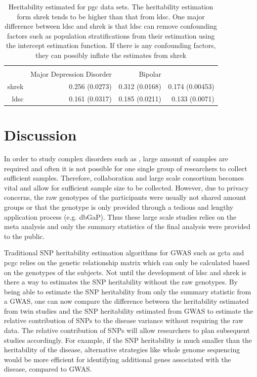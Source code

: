 		\begin{table}
			\centering
			\begin{tabular}{rrrr}
				\toprule
				 \\
				& Major Depression Disorder & Bipolar & \Glng{scz}\\
				\midrule
				\gls{shrek}   & 0.256 (0.0273)  & 0.312 (0.0168)  & 0.174 (0.00453) \\
				\gls{ldsc}   & 0.161 (0.0317) & 0.185 (0.0211) & 0.133 (0.0071)\\
				\bottomrule
			\end{tabular}
			\caption[Heritability Estimated for PGC Data Sets]{
				Heritability estimated for \gls{pgc} data sets.
				The heritability estimation form \gls{shrek} tends to be higher than that from \gls{ldsc}.
				One major difference between \gls{ldsc} and \gls{shrek} is that \gls{ldsc} can remove confounding factors such as population stratifications from their estimation using the intercept estimation function. 
				If there is any confounding factors, they can possibly inflate the estimates from \gls{shrek}
			}
			\label{tab:realData}
		\end{table}
		
	\section{Discussion}
	In order to study complex disorders such as , large amount of samples are required and often it is not possible for one single group of researchers to collect sufficient samples.
	Therefore, collaboration and large scale consortium becomes vital and allow for sufficient sample size to be collected.
	However, due to privacy concerns, the raw genotypes of the participants were usually not shared amount groups or that the genotype is only provided through a tedious and lengthy application process (e.g. dbGaP).
	Thus these large scale studies relies on the meta analysis and only the summary statistics of the final analysis were provided to the public.
	
	Traditional \gls{SNP} heritability estimation algorithms for \gls{GWAS} such as \gls{gcta} and \gls{pcgc} relies on the genetic relationship matrix which can only be calculated based on the genotypes of the subjects.
	Not until the development of \gls{ldsc} and \gls{shrek} is there a way to estimates the \gls{SNP} heritability without the raw genotypes.
	By being able to estimate the \gls{SNP} heritability from only the summary statistic from a \gls{GWAS}, one can now compare the difference between the heritability estimated from twin studies and the \gls{SNP} heritability estimated from \gls{GWAS} to estimate the relative contribution of \glspl{SNP} to the disease variance without requiring the raw data.
	The relative contribution of \glspl{SNP} will allow researchers to plan subsequent studies accordingly.
	For example, if the \gls{SNP} heritability is much smaller than the heritability of the disease, alternative strategies like whole genome sequencing would be more efficient for identifying additional genes associated with the disease, compared to \gls{GWAS}.
	
